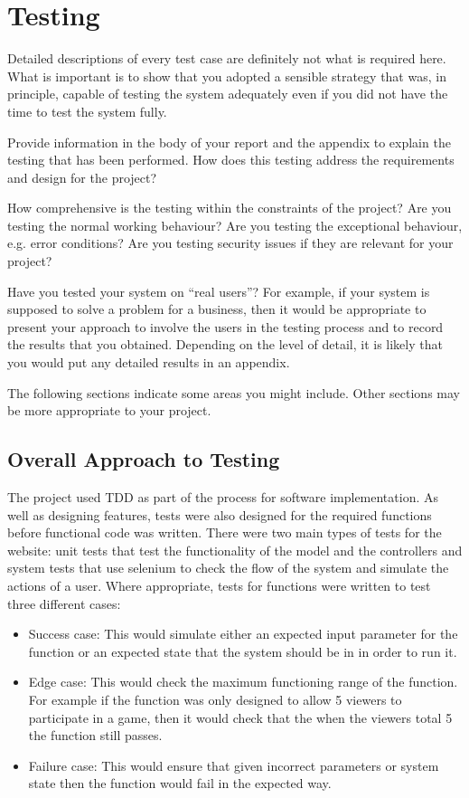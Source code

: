 \chapter{Testing}

Detailed descriptions of every test case are definitely not what is required here. What is important is to show that you adopted a sensible strategy that was, in principle, capable of testing the system adequately even if you did not have the time to test the system fully.

Provide information in the body of your report and the appendix to explain the testing that has been performed. How does this testing address the requirements and design for the project?

How comprehensive is the testing within the constraints of the project?  Are you testing the normal working behaviour? Are you testing the exceptional behaviour, e.g. error conditions? Are you testing security issues if they are relevant for your project? 

Have you tested your system on ``real users''? For example, if your system is supposed to solve a problem for a business, then it would be appropriate to present your approach to involve the users in the testing process and to record the results that you obtained. Depending on the level of detail, it is likely that you would put any detailed results in an appendix.

The following sections indicate some areas you might include. Other sections may be more appropriate to your project. 

\section{Overall Approach to Testing}
The project used TDD as part of the process for software implementation. As well as designing features, tests were also designed for the required functions before functional code was written. There were two main types of tests for the website: unit tests that test the functionality of the model and the controllers and system tests that use selenium to check the flow of the system and simulate the actions of a user. Where appropriate, tests for functions were written to test three different cases:
\begin{itemize}
\item Success case: This would simulate either an expected input parameter for the function or an expected state that the system should be in in order to run it. 
\item Edge case: This would check the maximum functioning range of the function. For example if the function was only designed to allow 5 viewers to participate in a game, then it would check that the when the viewers total 5 the function still passes.
\item Failure case: This would ensure that given incorrect parameters or system state then the function would fail in the expected way.
\end{itemize}

